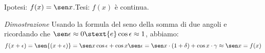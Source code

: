 \noindent Ipotesi: \(f(x)=\sen x\).\tab Tesi: \(f(x)\) è continua.

\begin{center} \continuitafseno \end{center}

\noindent \emph{Dimostrazione}
Usando la formula del seno della somma di due angoli e ricordando che 
\(\sen \epsilon \approx 0 \stext{e} \cos \epsilon \approx 1\),
abbiamo:
\[f(x+\epsilon) =
\sen{(x+\epsilon)} = \sen x \cos \epsilon + \cos x \sen \epsilon = 
\sen x \cdot (1 + \delta) + \cos x \cdot \gamma \approx
\sen x = f(x)\]

% 
% 
% 
% 




